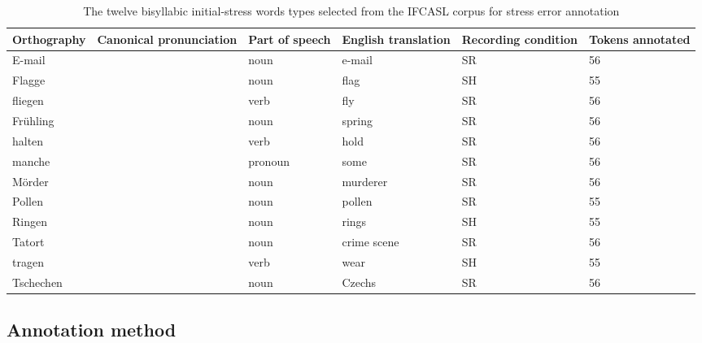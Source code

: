 	\begin{table}[htb]
		\centering
		\caption{The twelve bisyllabic initial-stress words types selected from the IFCASL corpus for stress error annotation %
		}
		
		\begin{tabularx}{\textwidth}{lXXXXX}
		\toprule
		
		Orthography & 
		Canonical \linebreak pronunciation & 
		Part of speech & 
		English \linebreak translation & 
		Recording condition & 
		Tokens \linebreak annotated\\
		
		\midrule
		E-mail	&	\TODO{prons} &	noun &	e-mail &	SR 	&	56	\\
		Flagge	&	&	noun &	 flag &	SH	&	55	\\
		fliegen	&	&	verb &	fly &	SR		& 56	\\
		Frühling	&	& noun	&	spring &	SR		&	56	\\
		halten	&	&	verb &	hold &	SR 	&	56	\\
		manche	&	&	pronoun &	some & 	SR 	&	56	\\
		Mörder	&	&	noun &	murderer &	SR 	&	56	\\
		Pollen	&	&	noun &	pollen &	SR 	& 	55	\\
		Ringen	&	&	noun &	rings &	SH	&	55	\\
		Tatort	&	&	noun &	crime scene & 	SR 	&		56	\\
		tragen	&	&	verb &	wear &	SH	&	55	\\
		Tschechen	&	& noun	&	Czechs	&	SR		& 56	\\
		\bottomrule
		\end{tabularx}
		\label{tab:bisyllwords}
	\end{table}

	\subsection{Annotation method}

